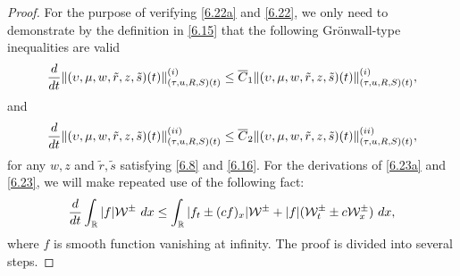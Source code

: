 \documentclass[10pt,a4paper]{amsart}
\newcommand{\fr}{\frac}
\begin{document}
\begin{proof}
For the purpose of verifying \eqref{6.22a} and \eqref{6.22}, we only need to demonstrate by the definition in \eqref{6.15} that the following Gr\"onwall-type inequalities are valid
\begin{align}\label{6.23a}
\begin{split}
\fr{\rm d}{{\rm d}t}\|(\upsilon, \mu, w, \tilde{r}, z, \tilde{s})(t)\|_{(\tau, u, R, S)(t)}^{(i)}\leq \overline{C}_1\|(\upsilon, \mu, w, \tilde{r}, z, \tilde{s})(t)\|_{(\tau, u, R, S)(t)}^{(i)},
\end{split}
\end{align}
and
\begin{align}\label{6.23}
\begin{split}
\fr{\rm d}{{\rm d}t}\|(\upsilon, \mu, w, \tilde{r}, z, \tilde{s})(t)\|_{(\tau, u, R, S)(t)}^{(ii)}\leq \overline{C}_2\|(\upsilon, \mu, w, \tilde{r}, z, \tilde{s})(t)\|_{(\tau, u, R, S)(t)}^{(ii)},
\end{split}
\end{align}
for any $w,z$ and $\tilde{r}, \tilde{s}$ satisfying \eqref{6.8} and \eqref{6.16}.
For the derivations of \eqref{6.23a} and \eqref{6.23}, we will make repeated use of the following fact:
\begin{align}\label{6.24}
\begin{split}
\fr{{\rm d}}{{\rm d}t}\int_{\mathbb{R}} |f|\mathcal{W}^\pm\ {\rm d}x\leq \int_{\mathbb{R}} |f_t\pm(cf)_x|\mathcal{W}^\pm + |f|(\mathcal{W}^{\pm}_t\pm c\mathcal{W}^{\pm}_x)\ {\rm d}x,
\end{split}
\end{align}
where $f$ is smooth function vanishing at infinity. The proof is divided into several steps.


\end{proof}
\end{document}
